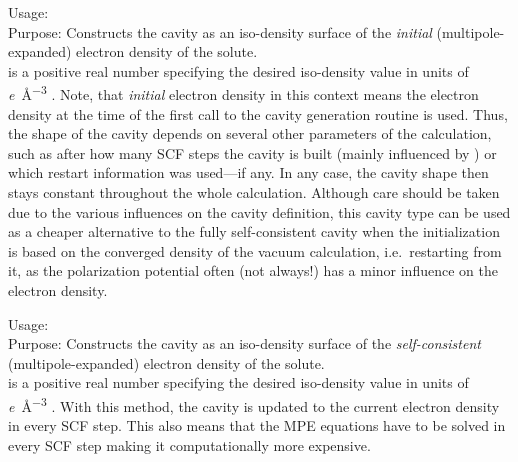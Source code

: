 {
  \noindent
  Usage:  
     \\[1.0ex] 
  Purpose: Constructs the cavity as an iso-density surface of the 
    \emph{initial} (multipole-expanded) electron density of the solute. \\[1.0ex]
   is a positive real number specifying the 
    desired iso-density value in units of 
    \si{\elementarycharge\per\cubic\angstrom} .
}
Note, that \emph{initial} electron density in this context means 
the electron density at the time of the first call to the cavity 
generation routine is used. Thus, the shape of the cavity depends 
on several other parameters of the calculation, such as after how 
many SCF steps the cavity is built (mainly influenced by 
) or which restart 
information was used---if any. 
In any case, the cavity shape then stays constant throughout 
the whole calculation. 
Although care should be taken due to the various influences on the 
cavity definition, this cavity type can be used as a cheaper 
alternative to the fully self-consistent cavity when the 
initialization is based on the converged density of the vacuum 
calculation, i.e.~restarting from it, as the polarization 
potential often (not always!) has a minor influence on the 
electron density. 

{
  \noindent
  Usage:  
     \\[1.0ex] 
  Purpose: Constructs the cavity as an iso-density surface of the 
    \emph{self-consistent} (multipole-expanded) electron density 
    of the solute. \\[1.0ex]
   is a positive real number specifying the 
    desired iso-density value in units of 
    \si{\elementarycharge\per\cubic\angstrom} .
}
With this method, the cavity is updated to the current electron 
density in every SCF step. This also means that the MPE equations 
have to be solved in every SCF step making it computationally 
more expensive. 

